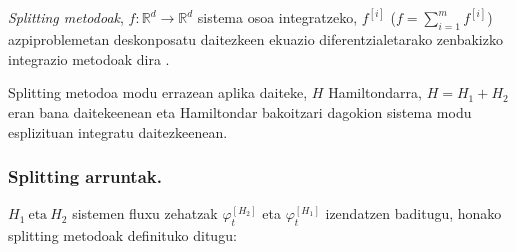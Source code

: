 \emph{Splitting metodoak}, $f: \mathbb{R}^d \rightarrow \mathbb{R}^d$ sistema osoa integratzeko, $f^{[i]}$ ($f=\sum\limits_{i=1}^{m} f^{[i]}$) azpiproblemetan deskonposatu daitezkeen ekuazio diferentzialetarako zenbakizko integrazio metodoak dira \cite{SSerna2015b,Hairer2006}.

Splitting metodoa modu errazean aplika daiteke, $H$ Hamiltondarra, $H=H_1+H_2$ eran bana daitekeenean eta Hamiltondar bakoitzari dagokion sistema modu esplizituan integratu daitezkeenean.  

\subsubsection*{Splitting arruntak.}

$H_1 \ \text{eta} \ H_2$ sistemen fluxu zehatzak $\varphi_t^{[H_2]}$ eta $\varphi_t^{[H_1]}$ izendatzen baditugu, honako splitting metodoak definituko ditugu:


